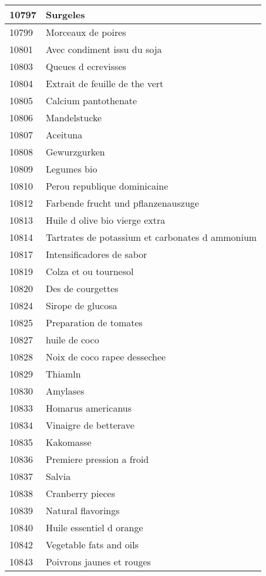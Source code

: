 \begin{longtable}{|l|l|}
10797 & Surgeles \\ \hline 
10799 & Morceaux de poires \\ \hline 
10801 & Avec condiment issu du soja \\ \hline 
10803 & Queues d ecrevisses \\ \hline 
10804 & Extrait de feuille de the vert \\ \hline 
10805 & Calcium pantothenate \\ \hline 
10806 & Mandelstucke \\ \hline 
10807 & Aceituna \\ \hline 
10808 & Gewurzgurken \\ \hline 
10809 & Legumes bio \\ \hline 
10810 & Perou republique dominicaine \\ \hline 
10812 & Farbende frucht und pflanzenauszuge \\ \hline 
10813 & Huile d olive bio vierge extra \\ \hline 
10814 & Tartrates de potassium et carbonates d ammonium \\ \hline 
10817 & Intensificadores de sabor \\ \hline 
10819 & Colza et ou tournesol \\ \hline 
10820 & Des de courgettes \\ \hline 
10824 & Sirope de glucosa \\ \hline 
10825 & Preparation de tomates \\ \hline 
10827 & huile de coco \\ \hline 
10828 & Noix de coco rapee dessechee \\ \hline 
10829 & Thiamln \\ \hline 
10830 & Amylases \\ \hline 
10833 & Homarus americanus \\ \hline 
10834 & Vinaigre de betterave \\ \hline 
10835 & Kakomasse \\ \hline 
10836 & Premiere pression a froid \\ \hline 
10837 & Salvia \\ \hline 
10838 & Cranberry pieces \\ \hline 
10839 & Natural flavorings \\ \hline 
10840 & Huile essentiel d orange \\ \hline 
10842 & Vegetable fats and oils \\ \hline 
10843 & Poivrons jaunes et rouges \\ \hline 

\end{longtable}
